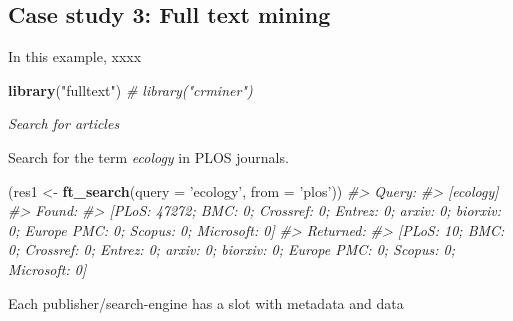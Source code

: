 \documentclass[author-year, review, 11pt]{components/elsarticle} %
\newenvironment{Shaded}{\begin{snugshade}}{\end{snugshade}}
\newcommand{\CommentTok}[1]{\textcolor[rgb]{0.56,0.35,0.01}{\textit{#1}}}
\newcommand{\DataTypeTok}[1]{\textcolor[rgb]{0.13,0.29,0.53}{#1}}
\newcommand{\KeywordTok}[1]{\textcolor[rgb]{0.13,0.29,0.53}{\textbf{#1}}}
\newcommand{\NormalTok}[1]{#1}
\newcommand{\OperatorTok}[1]{\textcolor[rgb]{0.81,0.36,0.00}{\textbf{#1}}}
\newcommand{\StringTok}[1]{\textcolor[rgb]{0.31,0.60,0.02}{#1}}
\begin{document}
\hypertarget{case-study-3-full-text-mining}{%
\subsection{Case study 3: Full text
mining}\label{case-study-3-full-text-mining}}

In this example, xxxx

\begin{Shaded}
\begin{Highlighting}[]
\KeywordTok{library}\NormalTok{(}\StringTok{"fulltext"}\NormalTok{)}
\CommentTok{# library("crminer")}
\end{Highlighting}
\end{Shaded}

\emph{Search for articles}

Search for the term \emph{ecology} in PLOS journals.

\begin{Shaded}
\begin{Highlighting}[]
\NormalTok{(res1 <-}\StringTok{ }\KeywordTok{ft_search}\NormalTok{(}\DataTypeTok{query =} \StringTok{'ecology'}\NormalTok{, }\DataTypeTok{from =} \StringTok{'plos'}\NormalTok{))}
\CommentTok{#> Query:}
\CommentTok{#>   [ecology] }
\CommentTok{#> Found:}
\CommentTok{#>   [PLoS: 47272; BMC: 0; Crossref: 0; Entrez: 0; arxiv: 0; biorxiv: 0; Europe PMC: 0; Scopus: 0; Microsoft: 0] }
\CommentTok{#> Returned:}
\CommentTok{#>   [PLoS: 10; BMC: 0; Crossref: 0; Entrez: 0; arxiv: 0; biorxiv: 0; Europe PMC: 0; Scopus: 0; Microsoft: 0]}
\end{Highlighting}
\end{Shaded}

Each publisher/search-engine has a slot with metadata and data

\begin{Shaded}
\end{Shaded}
\end{document}
